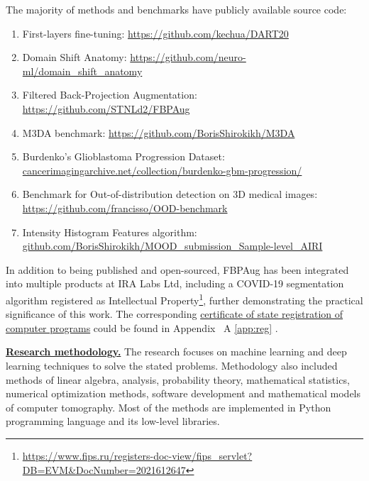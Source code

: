 The majority of methods and benchmarks have publicly available source code:

\begin{enumerate}
	\item First-layers fine-tuning: \href{https://github.com/kechua/DART20}{https://github.com/kechua/DART20}
	\item Domain Shift Anatomy: \hfill \hfill \linebreak \href{https://github.com/neuro-ml/domain_shift_anatomy}{https://github.com/neuro-ml/domain\_shift\_anatomy}
	\item Filtered Back-Projection Augmentation: \hfill \hfill \linebreak \href{https://github.com/STNLd2/FBPAug}{https://github.com/STNLd2/FBPAug}
	\item M3DA benchmark: \href{https://github.com/BorisShirokikh/M3DA}{https://github.com/BorisShirokikh/M3DA}
	\item {Burdenko's Glioblastoma Progression Dataset: \hfill \hfill \linebreak \href{https://www.cancerimagingarchive.net/collection/burdenko-gbm-progression/}{cancerimagingarchive.net/collection/burdenko-gbm-progression/}}
	\item Benchmark for Out-of-distribution detection on 3D medical images: \hfill \linebreak \href{https://github.com/francisso/OOD-benchmark}{https://github.com/francisso/OOD-benchmark}
	\item Intensity Histogram Features algorithm: \hfill \hfill \linebreak \href{https://github.com/BorisShirokikh/MOOD\_submission\_Sample-level\_AIRI}{github.com/BorisShirokikh/MOOD\_submission\_Sample-level\_AIRI}
\end{enumerate}

In addition to being published and open-sourced, FBPAug has been integrated into multiple products at IRA Labs Ltd, including a COVID-19 segmentation algorithm registered as Intellectual Property\footnote{\href{https://www.fips.ru/registers-doc-view/fips\_servlet?DB=EVM\&DocNumber=2021612647}{https://www.fips.ru/registers-doc-view/fips\_servlet?DB=EVM\&DocNumber=2021612647}}, further demonstrating the practical significance of this work. The corresponding \underline{certificate of state registration of computer programs} could be found in Appendix~%
\ifsynopsis
  A%
\else
  \ref{app:reg}%
\fi
.


\underline{\textbf{Research methodology.}} The research focuses on machine learning and deep learning techniques to solve the stated problems. Methodology also included methods of linear algebra, analysis, probability theory, mathematical statistics, numerical optimization methods, software development and mathematical models of computer tomography. Most of the methods are implemented in Python programming language and its low-level libraries.

